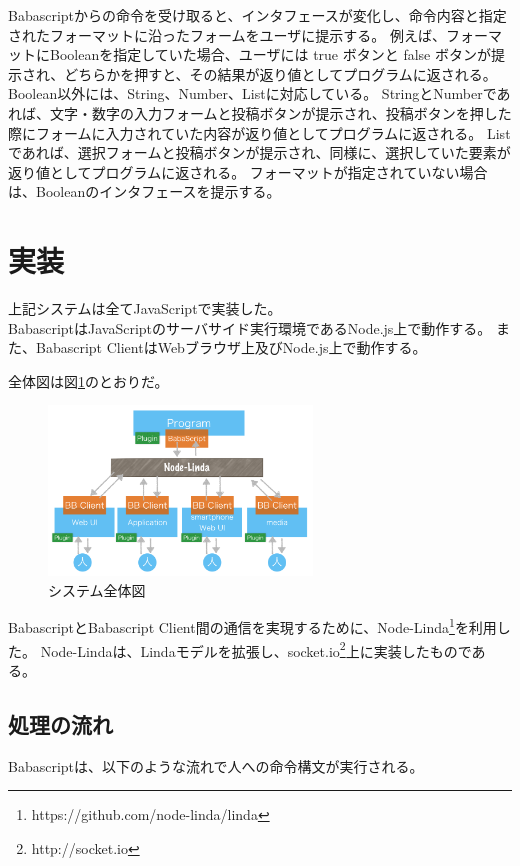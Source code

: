\documentclass[twoside]{wiss}
\begin{document}
Babascriptからの命令を受け取ると、インタフェースが変化し、命令内容と指定されたフォーマットに沿ったフォームをユーザに提示する。
例えば、フォーマットにBooleanを指定していた場合、ユーザには true ボタンと false ボタンが提示され、どちらかを押すと、その結果が返り値としてプログラムに返される。
Boolean以外には、String、Number、Listに対応している。
StringとNumberであれば、文字・数字の入力フォームと投稿ボタンが提示され、投稿ボタンを押した際にフォームに入力されていた内容が返り値としてプログラムに返される。
Listであれば、選択フォームと投稿ボタンが提示され、同様に、選択していた要素が返り値としてプログラムに返される。
フォーマットが指定されていない場合は、Booleanのインタフェースを提示する。

\section{実装}

上記システムは全てJavaScriptで実装した。\\
BabascriptはJavaScriptのサーバサイド実行環境であるNode.js上で動作する。
また、Babascript ClientはWebブラウザ上及びNode.js上で動作する。

全体図は図\ref{system}のとおりだ。

\begin{figure}[h]
  \includegraphics[width=70mm, bb=0 0 928 599]{./images/system.png}
  \caption{システム全体図}  
  \label{system}
\end{figure}

BabascriptとBabascript Client間の通信を実現するために、Node-Linda\footnote{https://github.com/node-linda/linda}を利用した。
Node-Lindaは、Linda\cite{linda}モデルを拡張し、socket.io\footnote{http://socket.io}上に実装したものである。

\subsection{処理の流れ}

Babascriptは、以下のような流れで人への命令構文が実行される。
\end{document}
